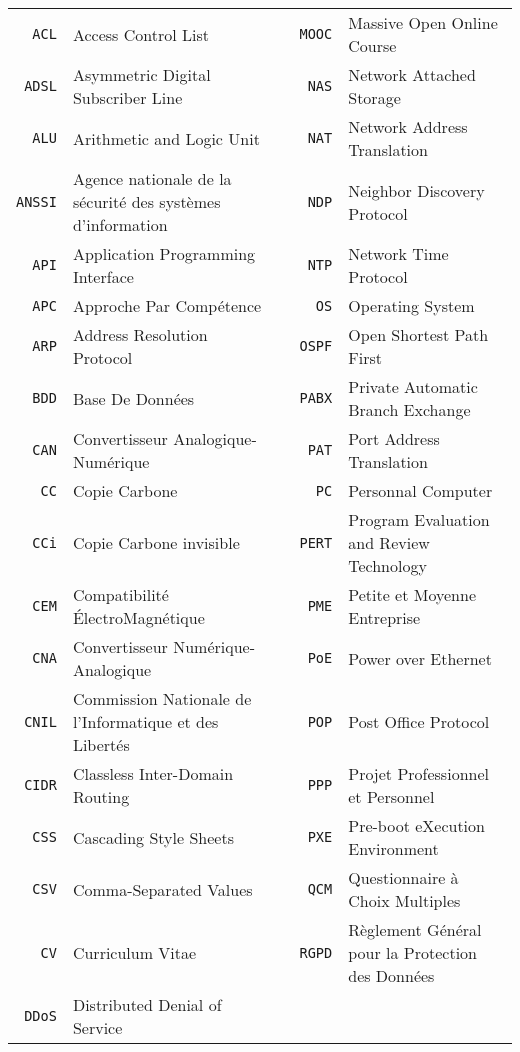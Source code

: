 \begin{tabular}{rp{6.5cm}p{0.5cm}rp{6.5cm}} 
\texttt{ACL} & Access Control List
 & & 
\texttt{MOOC} & Massive Open Online Course
\\ 
\texttt{ADSL} & Asymmetric Digital Subscriber Line
 & & 
\texttt{NAS} & Network Attached Storage
\\ 
\texttt{ALU} & Arithmetic and Logic Unit
 & & 
\texttt{NAT} & Network Address Translation
\\ 
\texttt{ANSSI} & Agence nationale de la sécurité des systèmes d'information
 & & 
\texttt{NDP} & Neighbor Discovery Protocol
\\ 
\texttt{API} & Application Programming Interface
 & & 
\texttt{NTP} & Network Time Protocol
\\ 
\texttt{APC} & Approche Par Compétence
 & & 
\texttt{OS} & Operating System
\\ 
\texttt{ARP} & Address Resolution Protocol
 & & 
\texttt{OSPF} & Open Shortest Path First
\\ 
\texttt{BDD} & Base De Données
 & & 
\texttt{PABX} & Private Automatic Branch Exchange
\\ 
\texttt{CAN} & Convertisseur Analogique-Numérique
 & & 
\texttt{PAT} & Port Address Translation
\\ 
\texttt{CC} & Copie Carbone
 & & 
\texttt{PC} & Personnal Computer
\\ 
\texttt{CCi} & Copie Carbone invisible
 & & 
\texttt{PERT} & Program Evaluation and Review Technology
\\ 
\texttt{CEM} & Compatibilité ÉlectroMagnétique
 & & 
\texttt{PME} & Petite et Moyenne Entreprise
\\ 
\texttt{CNA} & Convertisseur Numérique-Analogique
 & & 
\texttt{PoE} & Power over Ethernet
\\ 
\texttt{CNIL} & Commission Nationale de l'Informatique et des Libertés
 & & 
\texttt{POP} & Post Office Protocol
\\ 
\texttt{CIDR} & Classless Inter-Domain Routing
 & & 
\texttt{PPP} & Projet Professionnel et Personnel
\\ 
\texttt{CSS} & Cascading Style Sheets
 & & 
\texttt{PXE} & Pre-boot eXecution Environment
\\ 
\texttt{CSV} & Comma-Separated Values
 & & 
\texttt{QCM} & Questionnaire à Choix Multiples
\\ 
\texttt{CV} & Curriculum Vitae
 & & 
\texttt{RGPD} & Règlement Général pour la Protection des Données
\\ 
\texttt{DDoS} & Distributed Denial of Service

\end{tabular}
